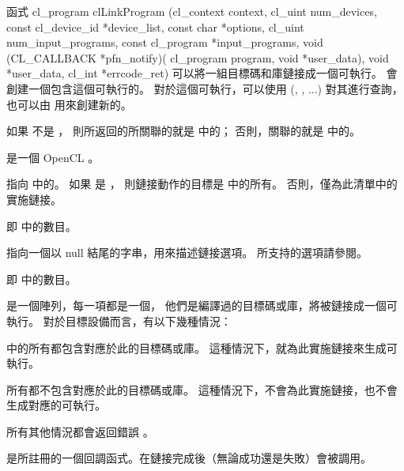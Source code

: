 函式
\startCLFUNC
cl_program clLinkProgram (cl_context context,
			cl_uint num_devices,
			const cl_device_id *device_list,
			const char *options,
			cl_uint num_input_programs,
			const cl_program *input_programs,
			void (CL_CALLBACK *pfn_notify)(
						cl_program program,
						void *user_data),
			void *user_data,
			cl_int *errcode_ret)
\stopCLFUNC
可以將一組目標碼和庫鏈接成一個可執行。
  會創建一個包含這個可執行的。
對於這個可執行，可以使用 (,
 , ...) 對其進行查詢，
也可以由  用來創建新的。

如果  不是 ，
則所返回的所關聯的就是  中的；
否則，關聯的就是  中的。

 是一個 OpenCL 。

 指向  中的。
如果  是 ，
則鏈接動作的目標是  中的所有。
否則，僅為此清單中的實施鏈接。

 即  中的數目。

 指向一個以 null 結尾的字串，用來描述鏈接選項。
所支持的選項請參閱。

 即  中的數目。

 是一個陣列，每一項都是一個，
他們是編譯過的目標碼或庫，將被鏈接成一個可執行。
對於目標設備而言，有以下幾種情況：
\startigBase
\item {} 中的所有都包含對應於此的目標碼或庫。
這種情況下，就為此實施鏈接來生成可執行。

\item 所有都不包含對應於此的目標碼或庫。
這種情況下，不會為此實施鏈接，也不會生成對應的可執行。

\item 所有其他情況都會返回錯誤 。
\stopigBase

 是所註冊的一個回調函式。在鏈接完成後（無論成功還是失敗）會被調用。

